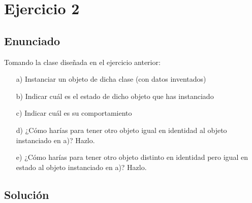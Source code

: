 \documentclass[a4paper,12pt]{article}
\begin{document}
\newpage

\section{Ejercicio 2}

\subsection{Enunciado}
Tomando la clase diseñada en el ejercicio anterior:
\begin{itemize}
    \item[a)] Instanciar un objeto de dicha clase (con datos inventados)
    \item[b)] Indicar cuál es el estado de dicho objeto que has instanciado
    \item[c)] Indicar cuál es su comportamiento
    \item[d)] ¿Cómo harías para tener otro objeto igual en identidad al objeto instanciado en a)? Hazlo.
    \item[e)] ¿Cómo harías para tener otro objeto distinto en identidad pero igual en estado al objeto instanciado en a)? Hazlo.
\end{itemize}

\subsection{Solución}
\end{document}

